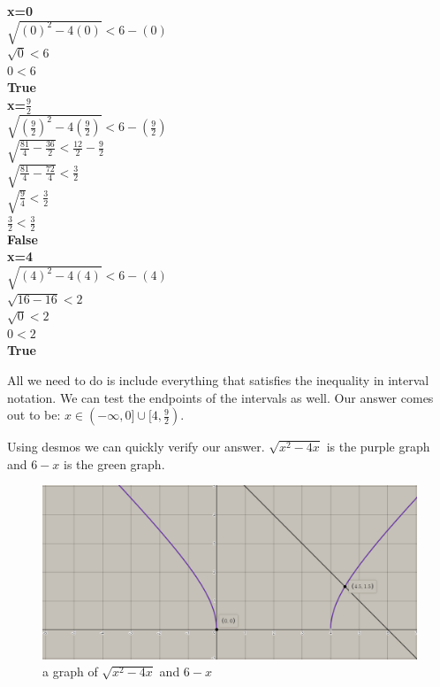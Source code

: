 \documentclass[12pt,fleqn]{book} %
\begin{document}
\begin{multicols}{3}
\begin{center}
    \textbf{x=0}\\
    $\sqrt{(0)^2-4(0)}<6-(0)$\\
    $\sqrt{0}<6$\\
    $0<6$\\
    \textbf{True}\\
    \columnbreak
    \textbf{x=$\frac{9}{2}$}\\
    $\sqrt{(\frac{9}{2})^2-4(\frac{9}{2})}<6-(\frac{9}{2})$\\
    $\sqrt{\frac{81}{4}-\frac{36}{2}}<\frac{12}{2}-\frac{9}{2}$\\
    $\sqrt{\frac{81}{4}-\frac{72}{4}}<\frac{3}{2}$\\
    $\sqrt{\frac{9}{4}}<\frac{3}{2}$\\
    $\frac{3}{2}<\frac{3}{2}$\\
    \textbf{False}\\
    \columnbreak
    \textbf{x=4}\\
    $\sqrt{(4)^2-4(4)}<6-(4)$\\
    $\sqrt{16-16}<2$\\
    $\sqrt{0}<2$\\
    $0<2$\\
    \textbf{True}\\
\end{center}
\end{multicols}

\noindent All we need to do is include everything that satisfies the inequality in interval notation. We can test the endpoints of the intervals as well. Our answer comes out to be: $x\in(-\infty,0]\cup[4,\frac{9}{2})$.\\

\pagebreak

\noindent Using desmos we can quickly verify our answer. $\sqrt{x^2-4x}$ is the purple graph and $6-x$ is the green graph.

\begin{figure}[h]
\centering\includegraphics[scale=0.4]{Pictures/Graph3.PNG}
\caption{a graph of $\sqrt{x^2-4x}$ and $6-x$}
\end{figure}
\end{document}

